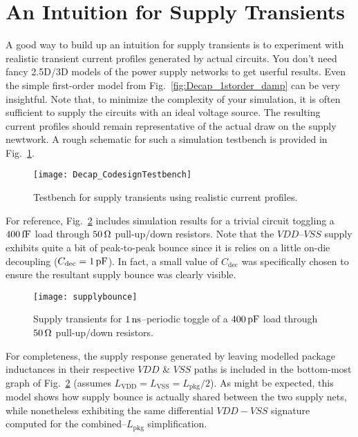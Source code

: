 \section{An Intuition for Supply Transients}
\par A good way to build up an intuition for supply transients is to experiment
with realistic transient current profiles generated by actual circuits. You don't
need fancy 2.5D/3D models of the power supply networks to get userful results.
Even the simple first-order model from Fig.~\ref{fig:Decap_1storder_damp} can be
very insightful.  Note that, to minimize the complexity of your simulation, it
is often sufficient to supply the circuits with an ideal voltage source. The
resulting current profiles should remain representative of the actual draw on
the supply newtwork. A rough schematic for such a simulation testbench is
provided in Fig.~\ref{fig:Testbench_SupplyTransient}.
%
\begin{figure}[!ht]
	\centering
	\texttt{[image: Decap\_CodesignTestbench]}
	\caption{Testbench for supply transients using realistic current profiles.}
\label{fig:Testbench_SupplyTransient}%
\end{figure}
%
\par For reference, Fig.~\ref{fig:Supplybounce} includes simulation results for
a trivial circuit toggling a $400\mathrm{\,fF}$ load through $50\mathrm{\,\Omega}$ pull-up/down
resistors. Note that the $VDD$--$VSS$ supply exhibits quite a bit of
peak-to-peak bounce since it is relies on a little on-die decoupling
($C_\mathrm{dec}=1\mathrm{\,pF}$). In fact, a small value of $C_\mathrm{dec}$ was
specifically chosen to ensure the resultant supply bounce was clearly visible.
%
\begin{figure}[!ht]
	\centering
	\texttt{[image: supplybounce]}
	\caption{Supply transients for $1\mathrm{\,ns}$--periodic toggle of a $400\mathrm{\,pF}$ load through $50\mathrm{\,\Omega}$ pull-up/down resistors.}
\label{fig:Supplybounce}%
\end{figure}
%
\par For completeness, the supply response generated by leaving modelled
package inductances in their respective $VDD$ \& $VSS$ paths is included in the
bottom-most graph of Fig.~\ref{fig:Supplybounce} (assumes
$L_\mathrm{VDD}=L_\mathrm{VSS}=L_\mathrm{pkg}/2$). As might be expected, this
model shows how supply bounce is actually shared between the two supply nets,
while nonetheless exhibiting the same differential $VDD-VSS$ signature
computed for the combined--$L_\mathrm{pkg}$ simplification.
%
